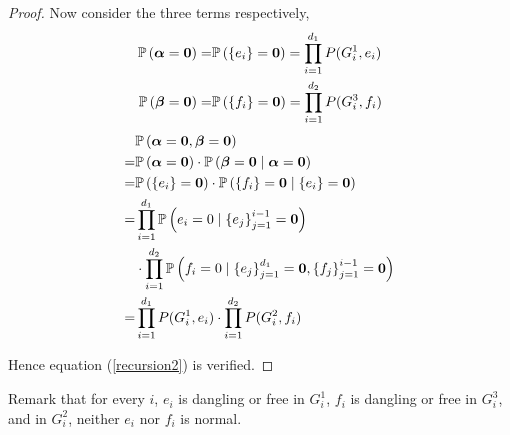 \begin{proof}
Now consider the three terms respectively,
	\begin{align*}
        \mathbb{P}\left( \boldsymbol\alpha = \mathbf{0}\right) =& \mathbb{P} \left( \left\{e_i\right\} = \mathbf{0}\right) =	\prod_{i=1}^{d_1} P(G_i^1, e_i) \\
        \mathbb{P}\left( \boldsymbol\beta = \mathbf{0}\right) =& \mathbb{P} \left( \left\{f_i\right\} = \mathbf{0}\right) =	\prod_{i=1}^{d_2} P(G_i^3, f_i)
    \end{align*}
	\begin{align*}
        &\mathbb{P}\left( \boldsymbol\alpha = \mathbf{0}, \boldsymbol\beta = \mathbf{0} \right) \\
        =&  \mathbb{P} \left( \boldsymbol\alpha = \mathbf{0} \right) \cdot \mathbb{P}\left( \boldsymbol\beta = \mathbf{0} \mid \boldsymbol\alpha = \mathbf{0} \right) \\
        =&  \mathbb{P} \left( \left\{e_i\right\} = \mathbf{0}\right) \cdot \mathbb{P} \left( \left\{f_i\right\} = \mathbf{0} \mid \left\{e_i\right\} = \mathbf{0} \right) \\
        =& \prod_{i=1}^{d_1} \mathbb{P} \left( e_i = 0 \mid \left\{e_j\right\}_{j=1}^{i-1} = \mathbf{0} \right) \\
         &\cdot \prod_{i=1}^{d_2} \mathbb{P} \left( f_i = 0 \mid \left\{e_j\right\}_{j=1}^{d_1} = \mathbf{0},\left\{f_j\right\}_{j=1}^{i-1} = \mathbf{0} \right) \\
        =& \prod_{i=1}^{d_1} P(G_i^1, e_i) \cdot \prod_{i=1}^{d_2} P(G_i^2, f_i)
	\end{align*}

	Hence equation (\ref{recursion2}) is verified.
\end{proof}

Remark that for every $i$, $e_i$ is dangling or free in $G_i^1$, $f_i$ is dangling or free in $G_i^3$, and in $G_i^2$, neither $e_i$ nor $f_i$ is normal.

